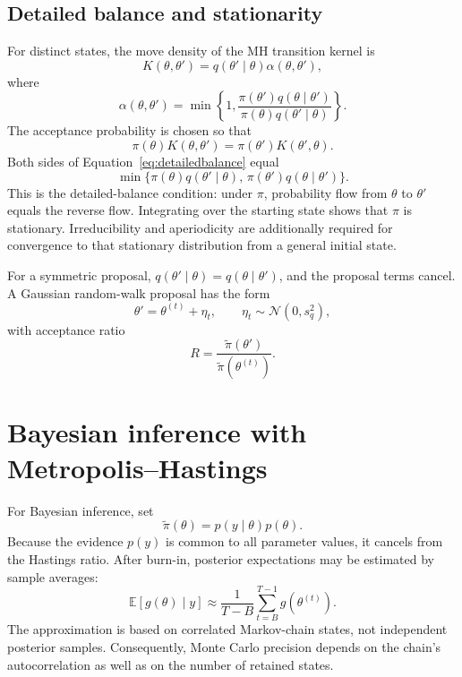 \documentclass[11pt,a4paper]{article}
\begin{document}
\subsection{Detailed balance and stationarity}
For distinct states, the move density of the MH transition kernel is
\begin{equation}
 K(\theta,\theta')=q(\theta'\mid\theta)\alpha(\theta,\theta'),
\end{equation}
where
\begin{equation}
 \alpha(\theta,\theta')=
 \min\left\{1,
 \frac{\pi(\theta')q(\theta\mid\theta')}
 {\pi(\theta)q(\theta'\mid\theta)}\right\}.
\end{equation}
The acceptance probability is chosen so that
\begin{equation}
 \pi(\theta)K(\theta,\theta')=
 \pi(\theta')K(\theta',\theta).
 \label{eq:detailedbalance}
\end{equation}
Both sides of Equation~\eqref{eq:detailedbalance} equal
\begin{equation}
 \min\{\pi(\theta)q(\theta'\mid\theta),\,
 \pi(\theta')q(\theta\mid\theta')\}.
\end{equation}
This is the detailed-balance condition: under \(\pi\), probability flow from \(\theta\) to \(\theta'\) equals the reverse flow. Integrating over the starting state shows that \(\pi\) is stationary. Irreducibility and aperiodicity are additionally required for convergence to that stationary distribution from a general initial state.

For a symmetric proposal, \(q(\theta'\mid\theta)=q(\theta\mid\theta')\), and the proposal terms cancel. A Gaussian random-walk proposal has the form
\begin{equation}
 \theta'=\theta^{(t)}+\eta_t,
 \qquad \eta_t\sim\mathcal N(0,s_q^2),
\end{equation}
with acceptance ratio
\begin{equation}
 R=\frac{\widetilde\pi(\theta')}{\widetilde\pi(\theta^{(t)})}.
\end{equation}

\section{Bayesian inference with Metropolis--Hastings}
For Bayesian inference, set
\begin{equation}
 \widetilde\pi(\theta)=p(y\mid\theta)p(\theta).
 \label{eq:bayestarget}
\end{equation}
Because the evidence \(p(y)\) is common to all parameter values, it cancels from the Hastings ratio. After burn-in, posterior expectations may be estimated by sample averages:
\begin{equation}
 \mathbb{E}[g(\theta)\mid y]
 \approx \frac{1}{T-B}\sum_{t=B}^{T-1}g(\theta^{(t)}).
 \label{eq:mcmcaverage}
\end{equation}
The approximation is based on correlated Markov-chain states, not independent posterior samples. Consequently, Monte Carlo precision depends on the chain's autocorrelation as well as on the number of retained states.
\end{document}
